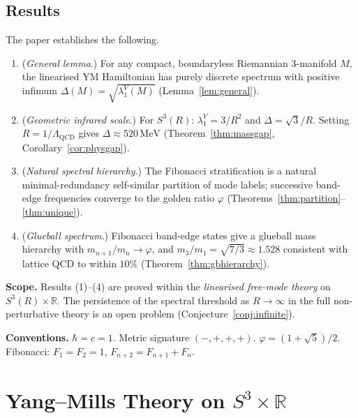 \documentclass[
  aps,
  prd,
  reprint,
  superscriptaddress,
  nofootinbib,
  longbibliography,
  amsmath,
  amssymb
]{revtex4-2}
\theoremstyle{plain}
\theoremstyle{definition}
\theoremstyle{remark}
\newcommand{\vp}{\varphi}
\newcommand{\Lqcd}{\Lambda_{\mathrm{QCD}}}
\begin{document}
\subsection{Results}

The paper establishes the following.

\begin{enumerate}[label=(\arabic*),noitemsep]
\item (\emph{General lemma}.) For any compact, boundaryless
  Riemannian 3-manifold $M$, the linearised YM Hamiltonian has
  purely discrete spectrum with positive infimum
  $\Delta(M)=\sqrt{\lambda_1^V(M)}$ (Lemma~\ref{lem:general}).

\item (\emph{Geometric infrared scale}.) For $S^3(R)$:
  $\lambda_1^V = 3/R^2$ and $\Delta = \sqrt3/R$.
  Setting $R=1/\Lqcd$ gives $\Delta\approx520\,\mathrm{MeV}$
  (Theorem~\ref{thm:massgap}, Corollary~\ref{cor:physgap}).

\item (\emph{Natural spectral hierarchy}.) The Fibonacci
  stratification is a natural minimal-redundancy
  self-similar partition of mode labels; successive band-edge
  frequencies converge to the golden ratio $\vp$
  (Theorems~\ref{thm:partition}--\ref{thm:unique}).

\item (\emph{Glueball spectrum}.) Fibonacci band-edge states give
  a glueball mass hierarchy with $m_{n+1}/m_n\to\vp$, and
  $m_3/m_1=\sqrt{7/3}\approx1.528$ consistent with lattice QCD
  to within $10\%$ (Theorem~\ref{thm:gbhierarchy}).
\end{enumerate}

\medskip\noindent\textbf{Scope.}
  Results (1)--(4) are proved within the \emph{linearised free-mode
  theory} on $S^3(R)\times\mathbb{R}$. The persistence of the
  spectral threshold as $R\to\infty$ in the full non-perturbative
  theory is an open problem (Conjecture~\ref{conj:infinite}).
\medskip

\medskip
\noindent\textbf{Conventions.} $\hbar=c=1$. Metric signature $(-,+,+,+)$.
$\vp=(1+\sqrt5)/2$. Fibonacci: $F_1=F_2=1$, $F_{n+2}=F_{n+1}+F_n$.

\section{\texorpdfstring{Yang--Mills Theory on $S^3\times\mathbb{R}$}{Yang--Mills Theory on S3 x R}}
\label{sec:ym}
\end{document}
